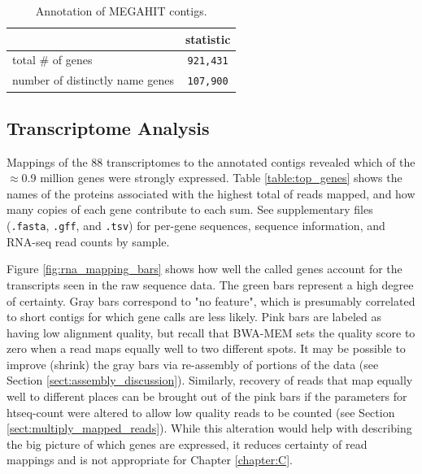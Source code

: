 \begin{table}[H]
\centering
\begin{singlespace}
\caption[Annotation of MEGAHIT contigs]
	{Annotation of MEGAHIT contigs.}
\begin{tabular}{l | c}
        & statistic  \\
\midrule
	total \# of genes & \texttt{921,431} \\ %
	number of distinctly name genes & \texttt{107,900} \\
\end{tabular}
\label{table:annotation}
\end{singlespace}
\end{table}







\subsection{Transcriptome Analysis}

Mappings of the 88 transcriptomes to the annotated contigs revealed which of the $\approx$0.9 million genes were strongly expressed.
Table \ref{table:top_genes} shows the names of the proteins associated with the highest total of reads mapped, and how many copies of each gene contribute to each sum.
See supplementary files (\texttt{.fasta}, \texttt{.gff}, and \texttt{.tsv}) for per-gene sequences, sequence information, and RNA-seq read counts by sample.

Figure \ref{fig:rna_mapping_bars} shows how well the called genes account for the transcripts seen in the raw sequence data.
The green bars represent a high degree of certainty.
Gray bars correspond to "no feature", which is presumably correlated to short contigs for which gene calls are less likely.
Pink bars are labeled as having low alignment quality, but recall that BWA-MEM sets the quality score to zero when a read maps equally well to two different spots.
It may be possible to improve (shrink) the gray bars via re-assembly of portions of the data (see Section \ref{sect:assembly_discussion}).
Similarly, recovery of reads that map equally well to different places can be brought out of the pink bars if the parameters for htseq-count were altered to allow low quality reads to be counted (see Section \ref{sect:multiply_mapped_reads}).
While this alteration would help with describing the big picture of which genes are expressed, it reduces certainty of read mappings and is not appropriate for Chapter \ref{chapter:C}.


